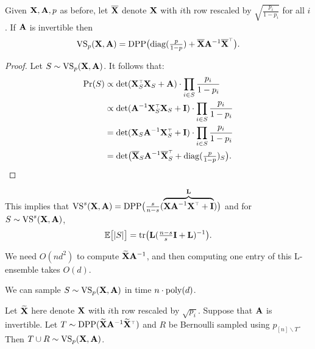\documentclass[12pt]{sty/colt2019/colt2018-arxiv}
\begin{document}
\begin{theorem}\label{t:reduction}
  Given $\mathbf X,\mathbf A,p$ as before, let $\overline{\mathbf X}$ denote $\mathbf X$ with $i$th
  row rescaled by $\sqrt{\!\frac{p_i}{1-p_i}}$ for all $i$. If $\mathbf A$ is
  invertible then
  \begin{align*}
    \Vol_p(\X,\A)=\DPP\big(\mathrm{diag}(\tfrac{p}{1-p}) + \Xbb\A^{-1}\Xbb^\top\big).
  \end{align*}
\end{theorem}
\begin{proof}
  Let $S\sim{\mathrm{VS}}_p(\mathbf X,\mathbf A)$. It follows that:
  \begin{align*}
    \Pr(S) &\propto \det(\X_S^\top\X_S+\A)\cdot
\prod_{i\in S}\frac{p_i}{1-p_i}
\\ &\propto \det(\A^{-1}\X_S^\top\X_S+\I) \cdot \prod_{i\in
     S}\frac{p_i}{1-p_i}
\\ &= \det(\X_S \A^{-1}\X_S^\top+\I) \cdot \prod_{i\in
     S}\frac{p_i}{1-p_i}
\\ &=\det\!\big(\Xbb_S \A^{-1}\Xbb_S^\top+\mathrm{diag}(\tfrac{p}{1-p})_S\big).
  \end{align*}
\end{proof}
\begin{remark}
  This implies that $\Vol^s(\X,\A) = \DPP\big(\frac
  s{n-s}(\overbrace{\X\A^{-1}\X^\top+\I}^{\L})\big)$ and for $S\sim{\mathrm{VS}}^s(\mathbf X,\mathbf A)$,
  \begin{align*}
    \mathbb E\big[|S|\big]
   = \mathrm{tr}\big(\mathbf{L}(\tfrac{n-s}s \mathbf I + \mathbf{L})^{-1}\big).
  \end{align*}
\end{remark}
We need $O(nd^2)$ to compute $\widetilde{\mathbf{X}}\mathbf A^{-1}$, and then
computing one entry of this L-ensemble takes $O(d)$. 
\begin{corollary}
  We can sample $S\sim{\mathrm{VS}}_p(\mathbf X,\mathbf A)$ in time $n\cdot{\mathrm{poly}}(d)$.
\end{corollary}
\begin{theorem}
Let $\widetilde{\mathbf{X}}$ here denote $\mathbf X$ with $i$th row rescaled by
$\sqrt{p_i}$. Suppose that $\mathbf A$ is invertible. Let $T\sim\DPP(\Xt\A^{-1}\Xt^\top)$ and $R$ be Bernoulli
sampled using $p_{[n]\backslash T}$. Then $T\cup R\sim {\mathrm{VS}}_p(\mathbf X,\mathbf A)$.
\end{theorem}
\end{document}
